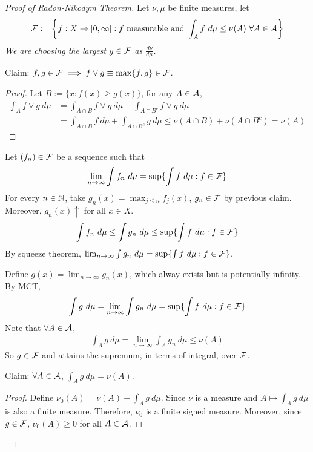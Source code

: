 \documentclass[11pt]{article}
\newcommand{\dmu}[0]{\ d\mu}
\begin{document}
	\begin{proof}[Proof of Radon-Nikodym Theorem]
		Let $\nu, \mu$ be finite measures, let
		\begin{align}
			\mc{F} := \left\{f: X \to [0, \infty] : f \tx{ measurable and } \int_A f\dmu \leq \nu(A)\ \forall A \in \mc{A}\right\}
		\end{align}
		\emph{We are choosing the largest $g \in \mathcal{{F}}$ as $\frac{d\nu}{d\mu}$.}
		
		Claim: $f, g \in \mathcal{{F}} \implies f \lor g \equiv \max\{f,g\} \in \mathcal{{F}}$.
		\begin{tcolorbox}
			\begin{proof}
				Let $B := \{x : f(x) \geq g(x)\}$, for any $A \in \mathcal{{A}}$,
				\begin{align}
					\int_A f \lor g\dmu &= \int_{A \cap B} f\lor g\dmu + \int_{A \cap B^c} f\lor g\dmu \\
					&= \int_{A \cap B} f\dmu + \int_{A \cap B^c} g\dmu \leq \nu(A \cap B) + \nu(A \cap B^c) = \nu(A)
				\end{align}
			\end{proof}	
		\end{tcolorbox}

		Let $(f_n) \in \mathcal{{F}}$ be a sequence such that
		\begin{align}
			\lim_{n\to\infty} \int f_n\dmu = \sup\{\int f\dmu : f \in \mc{F}\}
		\end{align}
		For every $n \in \mathbb{N}$, take $g_n(x) = \max_{j \leq n} f_j(x)$, $g_n \in \mathcal{{F}}$ by previous claim. Moreover, $g_n(x) \uparrow$ for all $x \in X$.
		\begin{align}
			\int f_n\dmu \leq \int g_n\dmu \leq \sup\{\int f\dmu : f \in \mc{F}\}
		\end{align}
		By squeeze theorem, $\lim_{n\to\infty} \int g_n\dmu = \sup\{\int f\dmu : f \in \mc{F}\}$.
		
		Define $g(x) = \lim_{n\to\infty}g_n(x)$, which alway exists but is potentially infinity.
		By MCT,
		\begin{align}
			\int g\dmu = \lim_{n\to\infty} \int g_n\dmu = \sup\{\int f\dmu : f \in \mc{F}\}
		\end{align}
		Note that $\forall A \in \mathcal{{A}}$,
		\begin{align}
			\int_A g\dmu = \lim_{n\to\infty} \int_A g_n\dmu \leq \nu(A)
		\end{align}
		So $g \in \mathcal{{F}}$ and attains the supremum, in terms of integral, over $\mathcal{{F}}$.
		
		Claim: $\forall A \in \mathcal{{A}}$, $\int_A g\dmu = \nu(A)$.
		\begin{tcolorbox}
			\begin{proof}
				Define $\nu_0(A) = \nu(A) - \int_A g\dmu$. Since $\nu$ is a measure and $A \mapsto \int_A g\dmu$ is also a finite measure. Therefore, $\nu_0$ is a finite signed measure. Moreover, since $g \in \mathcal{{F}}$, $\nu_0(A) \geq 0$ for all $A \in \mathcal{{A}}$.
				

\end{proof}
\end{tcolorbox}
\end{proof}
\end{document}
